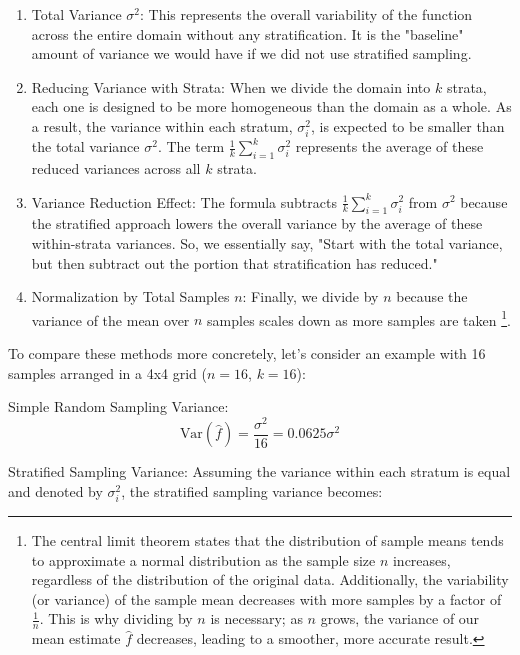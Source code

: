 \documentclass[12pt]{article}
\begin{document}
\begin{enumerate}
    \item Total Variance $\sigma^2$: This represents the overall variability of the function across the entire domain without any stratification. It is the "baseline" amount of variance we would have if we did not use stratified sampling.

    \item Reducing Variance with Strata: When we divide the domain into $k$ strata, each one is designed to be more homogeneous than the domain as a whole. As a result, the variance within each stratum, $\sigma_i^2$, is expected to be smaller than the total variance $\sigma^2$. The term $\frac{1}{k} \sum_{i=1}^k \sigma_i^2$ represents the average of these reduced variances across all $k$ strata.

    \item Variance Reduction Effect: The formula subtracts $\frac{1}{k} \sum_{i=1}^k \sigma_i^2$ from $\sigma^2$ because the stratified approach lowers the overall variance by the average of these within-strata variances. So, we essentially say, "Start with the total variance, but then subtract out the portion that stratification has reduced."

    \item Normalization by Total Samples $n$: Finally, we divide by $n$ because the variance of the mean over $n$ samples scales down as more samples are taken \footnote{The central limit theorem states that the distribution of sample means tends to approximate a normal distribution as the sample size $n$ increases, regardless of the distribution of the original data. Additionally, the variability (or variance) of the sample mean decreases with more samples by a factor of $\frac{1}{n}$. This is why dividing by $n$ is necessary; as $n$ grows, the variance of our mean estimate $\hat{f}$ decreases, leading to a smoother, more accurate result.}.

\end{enumerate}

To compare these methods more concretely, let's consider an example with 16 samples arranged in a 4x4 grid ($n = 16$, $k = 16$):

Simple Random Sampling Variance:
\[
    \text{Var}(\hat{f}) = \frac{\sigma^2}{16} = 0.0625\sigma^2
\]

Stratified Sampling Variance: Assuming the variance within each stratum is equal and denoted by $\sigma^2_i$, the stratified sampling variance becomes:
\end{document}
